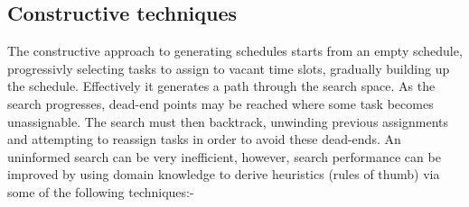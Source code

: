 \subsection{Constructive techniques}
\label{sub:review_constructive}

The constructive approach to generating schedules starts from an empty schedule, progressivly selecting tasks to assign to vacant time slots, gradually building up the schedule. Effectively it generates a path through the search space. As the search progresses, dead-end points may be reached where some task becomes unassignable. The search must then backtrack, unwinding previous assignments and attempting to reassign tasks in order to avoid these dead-ends. An uninformed search can be very inefficient, however, search performance can be improved by using domain knowledge to derive heuristics (rules of thumb) via some of the following techniques:- 


